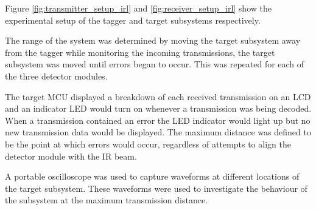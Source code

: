 Figure \ref{fig:transmitter_setup_irl} and \ref{fig:receiver_setup_irl} show the experimental setup of the tagger and target subsystems respectively.

The range of the system was determined by moving the target subsystem away from the tagger while monitoring the incoming transmissions, the target subsystem was moved until errors began to occur. This was repeated for each of the three detector modules.

The target MCU displayed a breakdown of each received transmission on an LCD and an indicator LED would turn on whenever a transmission was being decoded. When a transmission contained an error the LED indicator would light up but no new transmission data would be displayed. The maximum distance was defined to be the point at which errors would occur, regardless of attempts to align the detector module with the IR beam.

A portable oscilloscope was used to capture waveforms at different locations of the target subsystem. These waveforms were used to investigate the behaviour of the subsystem at the maximum transmission distance.


